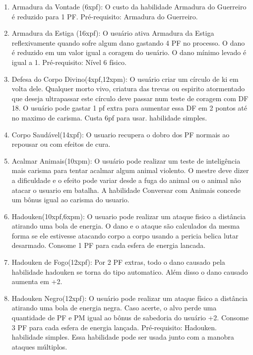 \begin{enumerate}
	\item Armadura da Vontade (6xpf): O custo da habilidade Armadura do Guerreiro é reduzido para 1 PF. Pré-requisito: Armadura do Guerreiro. 

	\item Armadura da Estiga (16xpf): O usuário ativa Armadura da Estiga reflexivamente quando sofre algum dano gastando 4 PF no processo. O dano é reduzido em um valor igual a coragem do usuário. O dano mínimo levado é igual a 1. Pré-requisito: Nível 6 físico. 

	\item Defesa do Corpo Divino(4xpf,12xpm): O usuário criar um círculo de ki em volta dele. Qualquer morto vivo, criatura das trevas ou espirito atormentado que deseja ultrapassar este círculo deve passar num teste de coragem com DF 18. O usuário pode gastar 1 pf extra para aumentar essa DF em 2 pontos até no maximo de carisma. Custa 6pf para usar. habilidade simples.

\item Corpo Saudável(14xpf): O usuario recupera o dobro dos PF normais ao repousar ou com efeitos de cura.
	
	\item Acalmar Animais(10xpm): O usuário pode realizar um teste de inteligência mais carisma para tentar acalmar algum animal violento. O mestre deve dizer a dificuldade e o efeito pode variar desde a fuga do animal ou o animal não atacar o usuario em batalha. A habilidade Conversar com Animais concede um bônus igual ao carisma do usuario.

  	\item Hadouken(10xpf,6xpm): O usuario pode realizar um ataque fisico a distância atirando uma bola de energia. O dano e o ataque são calculados da mesma forma se ele estivesse atacando corpo a corpo usando a pericia belica lutar desarmado. Consome 1 PF para cada esfera de energia lancada. 
  
\item Hadouken de Fogo(12xpf): Por 2 PF extras, todo o dano causado pela habilidade hadouken se torna do tipo automatico. Além disso o dano causado aumenta em +2. 

	\item Hadouken Negro(12xpf): O usuário pode realizar um ataque físico a distância atirando uma bola de energia negra. Caso acerte, o alvo perde uma quantidade de PF e PM igual ao bônus de sabedoria do usuário +2. Consome 3 PF para cada esfera de energia lançada. Pré-requisito: Hadouken. habilidade simples. Essa habilidade pode ser usada junto com a manobra ataques múltiplos.
		

\end{enumerate}
